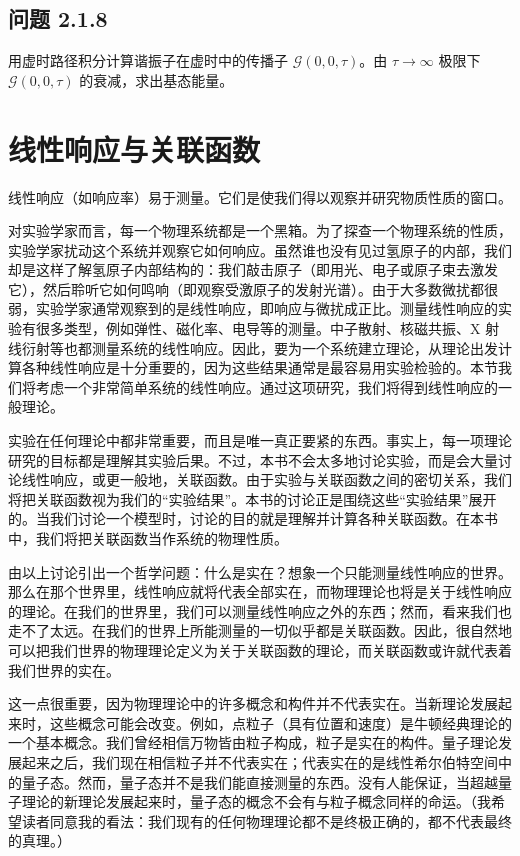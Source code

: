 \subsection*{问题 2.1.8}

用虚时路径积分计算谐振子在虚时中的传播子 $\mathcal{G}(0,0,\tau)$。由 $\tau\to\infty$ 极限下 $\mathcal{G}(0,0,\tau)$ 的衰减，求出基态能量。

\section{线性响应与关联函数}

\begin{keypoints}
\item 线性响应（如响应率）易于测量。它们是使我们得以观察并研究物质性质的窗口。
\end{keypoints}

对实验学家而言，每一个物理系统都是一个黑箱。为了探查一个物理系统的性质，实验学家扰动这个系统并观察它如何响应。虽然谁也没有见过氢原子的内部，我们却是这样了解氢原子内部结构的：我们敲击原子（即用光、电子或原子束去激发它），然后聆听它如何鸣响（即观察受激原子的发射光谱）。由于大多数微扰都很弱，实验学家通常观察到的是线性响应，即响应与微扰成正比。测量线性响应的实验有很多类型，例如弹性、磁化率、电导等的测量。中子散射、核磁共振、X 射线衍射等也都测量系统的线性响应。因此，要为一个系统建立理论，从理论出发计算各种线性响应是十分重要的，因为这些结果通常是最容易用实验检验的。本节我们将考虑一个非常简单系统的线性响应。通过这项研究，我们将得到线性响应的一般理论。

实验在任何理论中都非常重要，而且是唯一真正要紧的东西。事实上，每一项理论研究的目标都是理解其实验后果。不过，本书不会太多地讨论实验，而是会大量讨论线性响应，或更一般地，关联函数。由于实验与关联函数之间的密切关系，我们将把关联函数视为我们的“实验结果”。本书的讨论正是围绕这些“实验结果”展开的。当我们讨论一个模型时，讨论的目的就是理解并计算各种关联函数。在本书中，我们将把关联函数当作系统的物理性质。

由以上讨论引出一个哲学问题：什么是实在？想象一个只能测量线性响应的世界。那么在那个世界里，线性响应就将代表全部实在，而物理理论也将是关于线性响应的理论。在我们的世界里，我们可以测量线性响应之外的东西；然而，看来我们也走不了太远。在我们的世界上所能测量的一切似乎都是关联函数。因此，很自然地可以把我们世界的物理理论定义为关于关联函数的理论，而关联函数或许就代表着我们世界的实在。

这一点很重要，因为物理理论中的许多概念和构件并不代表实在。当新理论发展起来时，这些概念可能会改变。例如，点粒子（具有位置和速度）是牛顿经典理论的一个基本概念。我们曾经相信万物皆由粒子构成，粒子是实在的构件。量子理论发展起来之后，我们现在相信粒子并不代表实在；代表实在的是线性希尔伯特空间中的量子态。然而，量子态并不是我们能直接测量的东西。没有人能保证，当超越量子理论的新理论发展起来时，量子态的概念不会有与粒子概念同样的命运。（我希望读者同意我的看法：我们现有的任何物理理论都不是终极正确的，都不代表最终的真理。）

